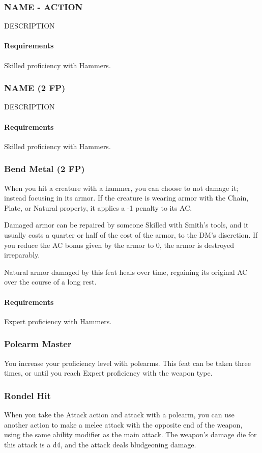 \subsubsection{NAME - ACTION} \label{feat::name}
    DESCRIPTION
    \paragraph{Requirements} Skilled proficiency with Hammers.
\subsubsection{NAME (2 FP)} \label{feat::name}
    DESCRIPTION
    \paragraph{Requirements} Skilled proficiency with Hammers.
\subsubsection{Bend Metal (2 FP)} \label{feat::bendmetal}
    When you hit a creature with a hammer, you can choose to not damage it; instead focusing in its armor.
    If the creature is wearing armor with the Chain, Plate, or Natural property, it applies a -1 penalty to its AC.

    Damaged armor can be repaired by someone Skilled with Smith's tools, and it usually costs a quarter or half of the cost of the armor, to the DM's discretion.
    If you reduce the AC bonus given by the armor to 0, the armor is destroyed irreparably.

    Natural armor damaged by this feat heals over time, regaining its original AC over the course of a long rest.
    \paragraph{Requirements} Expert proficiency with Hammers.
\subsubsection{Polearm Master} \label{feat::polearmmaster}
    You increase your proficiency level with polearms.
    This feat can be taken three times, or until you reach Expert proficiency with the weapon type.
\subsubsection{Rondel Hit} \label{feat::rondelhit}
    When you take the Attack action and attack with a polearm, you can use another action to make a melee attack with the opposite end of the weapon, using the same ability modifier as the main attack.
    The weapon's damage die for this attack is a d4, and the attack deals bludgeoning damage.

